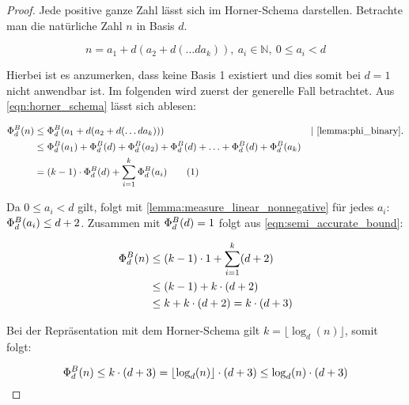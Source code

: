 \documentclass{article}
\theoremstyle{nonumberplain}
\newtheorem{proof}{Beweis}
\newcommand{\sidenote}[1]{&&|\ \text{#1}.}
\newcommand\numberthis{\addtocounter{equation}{1}\tag{\theequation}}
\begin{document}
\begin{proof}
    Jede positive ganze Zahl lässt sich im Horner-Schema darstellen.
    Betrachte man die natürliche Zahl \(n\) in Basis \(d\).

        \begin{equation}\label{eqn:horner_schema}
            n = a_1 + d (a_2 + d (\ldots d a_k)),\ a_i\in\mathbb{N},\ 0 \leq a_i < d
        \end{equation}

    Hierbei ist es anzumerken, dass keine Basis 1 existiert und dies somit bei \(d=1\) nicht anwendbar ist.
    Im folgenden wird zuerst der generelle Fall betrachtet.
    Aus \ref{eqn:horner_schema} lässt sich ablesen:

    \begin{align*}
        \measure{n} 
        &\leq \measure{a_1 + d (a_2 + d (\ldots d a_k))} \sidenote{\ref{lemma:phi_binary}} \\
        &\leq \measure{a_1} + \measure{d} + \measure{a_2} + \measure{d} + \ldots + \measure{d} + \measure{a_k} \\
        &= (k-1)\cdot\measure{d} + \sum_{i=1}^k \measure{a_i} \numberthis\label{eqn:semi_accurate_bound}
    \end{align*}
    
    Da \(0 \leq a_i < d\) gilt, folgt mit \ref{lemma:measure_linear_nonnegative} für jedes \(a_i\): \(\Phi_{d}^{B}(a_i) \leq d + 2\).
    Zusammen mit \(\Phi_{d}^{B}(d) = 1\) folgt aus \ref{eqn:semi_accurate_bound}:
    
    \begin{align*}
        \Phi_{d}^{B}(n) 
        &\leq (k-1) \cdot 1 + \sum_{i=1}^k (d+2) \\
        &\leq (k-1) + k \cdot (d+2) \\
        &\leq k + k \cdot (d+2) = k \cdot (d+3) \\
    \end{align*}
    
    Bei der Repräsentation mit dem Horner-Schema gilt \(k = \lfloor \log_d(n) \rfloor\), somit folgt:

        \[\Phi_{d}^{B}(n) \leq k \cdot (d+3) = \lfloor \log_d(n) \rfloor \cdot (d+3) \leq \log_d(n) \cdot (d+3)\]



\end{proof}
\end{document}
